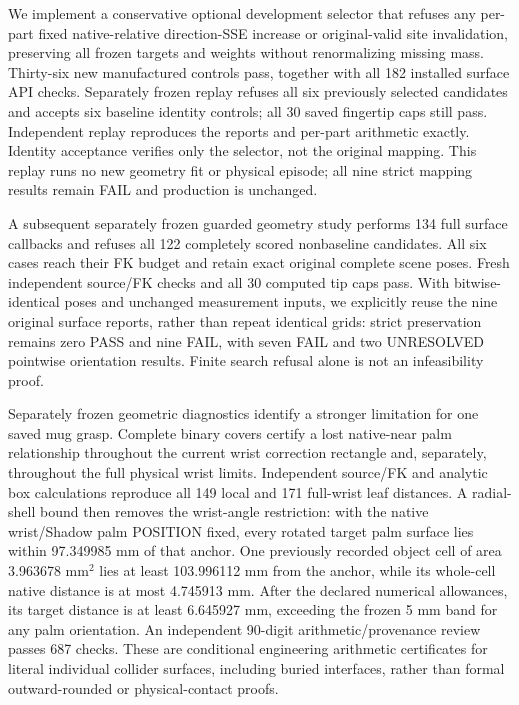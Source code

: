 \documentclass[10pt,letterpaper]{article}
\begin{document}
We implement a conservative optional development selector that refuses any
per-part fixed native-relative direction-SSE increase or original-valid site
invalidation, preserving all frozen targets and weights without renormalizing
missing mass. Thirty-six new manufactured controls pass, together with all
182 installed surface API checks. Separately frozen replay refuses all six
previously selected candidates and accepts six baseline identity controls;
all 30 saved fingertip caps still pass. Independent replay reproduces the
reports and per-part arithmetic exactly. Identity acceptance verifies only
the selector, not the original mapping. This replay runs no new geometry fit or physical episode; all nine strict
mapping results remain FAIL and production is unchanged.

A subsequent separately frozen guarded geometry study performs 134 full
surface callbacks and refuses all 122 completely scored nonbaseline
candidates. All six cases reach their FK budget and retain exact original
complete scene poses. Fresh independent source/FK checks and all 30 computed
tip caps pass. With bitwise-identical poses and unchanged measurement inputs, we explicitly
reuse the nine original surface reports, rather than repeat identical grids:
strict preservation remains zero PASS and nine FAIL, with seven FAIL and two
UNRESOLVED pointwise orientation results. Finite search refusal alone is not
an infeasibility proof.

Separately frozen geometric diagnostics identify a stronger limitation for
one saved mug grasp. Complete binary covers certify a lost native-near palm
relationship throughout the current wrist correction rectangle and, separately,
throughout the full physical wrist limits. Independent source/FK and analytic
box calculations reproduce all 149 local and 171 full-wrist leaf distances.
A radial-shell bound then removes the wrist-angle restriction: with the native
wrist/Shadow palm POSITION fixed, every rotated target palm surface lies within
97.349985 mm of that anchor. One previously recorded object cell of area
3.963678 mm$^2$ lies at least 103.996112 mm from the anchor, while its whole-cell
native distance is at most 4.745913 mm. After the declared numerical allowances,
its target distance is at least 6.645927 mm, exceeding the frozen 5 mm band
for any palm orientation. An independent 90-digit arithmetic/provenance review
passes 687 checks. These are conditional engineering arithmetic certificates
for literal individual collider surfaces, including buried interfaces, rather
than formal outward-rounded or physical-contact proofs.
\end{document}
